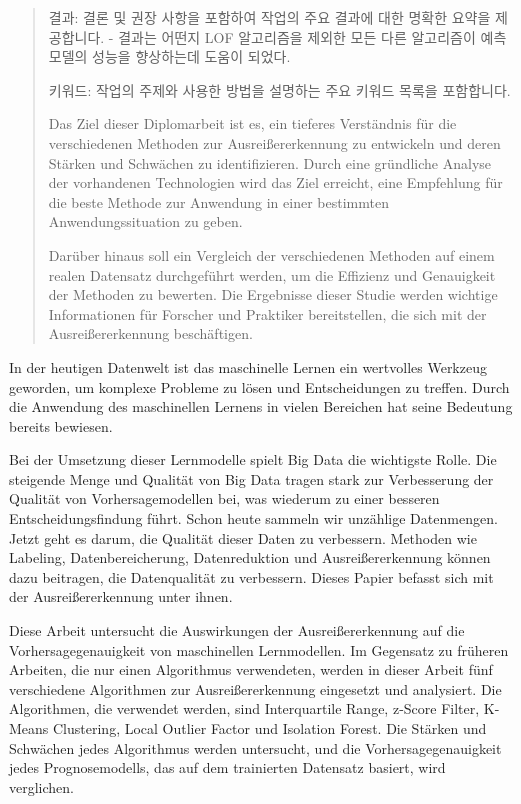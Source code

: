 \begin{abstract}
    결과: 결론 및 권장 사항을 포함하여 작업의 주요 결과에 대한 명확한 요약을 제공합니다. - 결과는 어떤지
    LOF 알고리즘을 제외한 모든 다른 알고리즘이 예측모델의 성능을 향상하는데 도움이 되었다. 

    키워드: 작업의 주제와 사용한 방법을 설명하는 주요 키워드 목록을 포함합니다.


    Das Ziel dieser Diplomarbeit ist es, ein tieferes Verständnis für die verschiedenen Methoden zur Ausreißererkennung zu entwickeln und deren Stärken und Schwächen zu identifizieren. Durch eine gründliche Analyse der vorhandenen Technologien wird das Ziel erreicht, eine Empfehlung für die beste Methode zur Anwendung in einer bestimmten Anwendungssituation zu geben.

    Darüber hinaus soll ein Vergleich der verschiedenen Methoden auf einem realen Datensatz durchgeführt werden, um die Effizienz und Genauigkeit der Methoden zu bewerten. Die Ergebnisse dieser Studie werden wichtige Informationen für Forscher und Praktiker bereitstellen, die sich mit der Ausreißererkennung beschäftigen.

\end{abstract}


In der heutigen Datenwelt ist das maschinelle Lernen ein wertvolles Werkzeug geworden, um komplexe Probleme zu lösen und Entscheidungen zu treffen. Durch die Anwendung des maschinellen Lernens in vielen Bereichen hat seine Bedeutung bereits bewiesen.

Bei der Umsetzung dieser Lernmodelle spielt Big Data die wichtigste Rolle. Die steigende Menge und Qualität von Big Data tragen stark zur Verbesserung der Qualität von Vorhersagemodellen bei, was wiederum zu einer besseren Entscheidungsfindung führt. Schon heute sammeln wir unzählige Datenmengen. Jetzt geht es darum, die Qualität dieser Daten zu verbessern. Methoden wie Labeling, Datenbereicherung, Datenreduktion und Ausreißererkennung können dazu beitragen, die Datenqualität zu verbessern. Dieses Papier befasst sich mit der Ausreißererkennung unter ihnen.

Diese Arbeit untersucht die Auswirkungen der Ausreißererkennung auf die Vorhersagegenauigkeit von maschinellen Lernmodellen. Im Gegensatz zu früheren Arbeiten, die nur einen Algorithmus verwendeten, werden in dieser Arbeit fünf verschiedene Algorithmen zur Ausreißererkennung eingesetzt und analysiert. Die Algorithmen, die verwendet werden, sind Interquartile Range, z-Score Filter, K-Means Clustering, Local Outlier Factor und Isolation Forest. Die Stärken und Schwächen jedes Algorithmus werden untersucht, und die Vorhersagegenauigkeit jedes Prognosemodells, das auf dem trainierten Datensatz basiert, wird verglichen.

